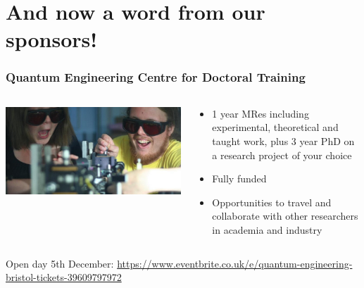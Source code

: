 \documentclass[]{beamer}
\begin{document}
\section{And now a word from our sponsors!}

\begin{frame}
\frametitle{Quantum Engineering Centre for Doctoral Training}

  \begin{columns}[T]
    \begin{column}{.5\textwidth}
    \begin{center}
    \includegraphics[scale=0.2]{cdt_open_day}
    \end{center}
    \end{column}
    \begin{column}{.5\textwidth}
    \begin{itemize}
    \item 1 year MRes including experimental, theoretical and taught work, plus 3 year PhD on a research project of your choice
    
    \item Fully funded
    
    \item Opportunities to travel and collaborate with other researchers in academia and industry
    \end{itemize}
    \end{column}
  \end{columns}
  
  Open day 5th December: \url{https://www.eventbrite.co.uk/e/quantum-engineering-bristol-tickets-39609797972}

\end{frame}

\end{document}
